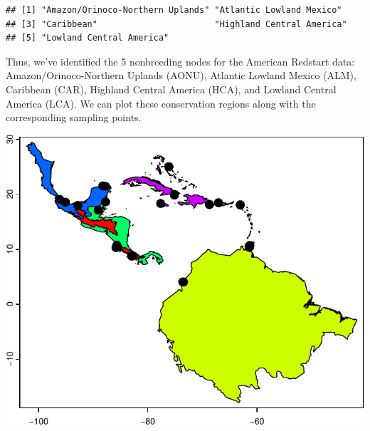 \documentclass[
]{book}
\newenvironment{Shaded}{\begin{snugshade}}{\end{snugshade}}
\newcommand{\AttributeTok}[1]{\textcolor[rgb]{0.13,0.29,0.53}{#1}}
\newcommand{\CommentTok}[1]{\textcolor[rgb]{0.56,0.35,0.01}{\textit{#1}}}
\newcommand{\DecValTok}[1]{\textcolor[rgb]{0.00,0.00,0.81}{#1}}
\newcommand{\FloatTok}[1]{\textcolor[rgb]{0.00,0.00,0.81}{#1}}
\newcommand{\FunctionTok}[1]{\textcolor[rgb]{0.13,0.29,0.53}{\textbf{#1}}}
\newcommand{\NormalTok}[1]{#1}
\newcommand{\OtherTok}[1]{\textcolor[rgb]{0.56,0.35,0.01}{#1}}
\newcommand{\SpecialCharTok}[1]{\textcolor[rgb]{0.81,0.36,0.00}{\textbf{#1}}}
\begin{document}
\begin{verbatim}
## [1] "Amazon/Orinoco-Northern Uplands" "Atlantic Lowland Mexico"        
## [3] "Caribbean"                       "Highland Central America"       
## [5] "Lowland Central America"
\end{verbatim}

Thus, we've identified the 5 nonbreeding nodes for the American Redstart data: Amazon/Orinoco-Northern Uplands (AONU), Atlantic Lowland Mexico (ALM), Caribbean (CAR), Highland Central America (HCA), and Lowland Central America (LCA). We can plot these conservation regions along with the corresponding sampling points.

\begin{Shaded}
\end{Shaded}

\includegraphics{Mignette_files/figure-latex/unnamed-chunk-15-1.pdf}
\end{document}

